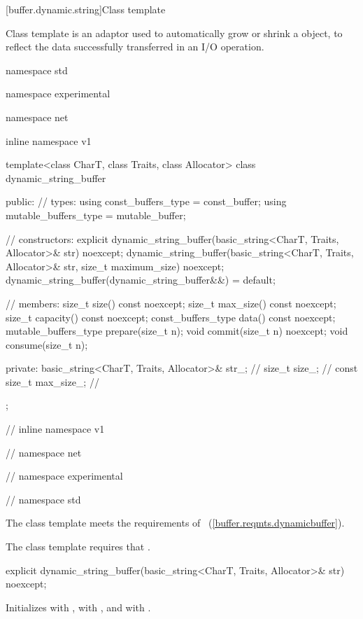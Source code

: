 [buffer.dynamic.string]{Class template }

%
\pnum
Class template  is an adaptor used to automatically grow or shrink a  object, to reflect the data successfully transferred in an I/O operation.

\begin{codeblock}
namespace std {
namespace experimental {
namespace net {
inline namespace v1 {

  template<class CharT, class Traits, class Allocator>
  class dynamic_string_buffer
  {
  public:
    // types:
    using const_buffers_type = const_buffer;
    using mutable_buffers_type = mutable_buffer;

    // constructors:
    explicit dynamic_string_buffer(basic_string<CharT, Traits, Allocator>& str) noexcept;
    dynamic_string_buffer(basic_string<CharT, Traits, Allocator>& str,
                          size_t maximum_size) noexcept;
    dynamic_string_buffer(dynamic_string_buffer&&) = default;

    // members:
    size_t size() const noexcept;
    size_t max_size() const noexcept;
    size_t capacity() const noexcept;
    const_buffers_type data() const noexcept;
    mutable_buffers_type prepare(size_t n);
    void commit(size_t n) noexcept;
    void consume(size_t n);

  private:
    basic_string<CharT, Traits, Allocator>& str_; // \expos
    size_t size_; // \expos
    const size_t max_size_; // \expos
  };

} // inline namespace v1
} // namespace net
} // namespace experimental
} // namespace std
\end{codeblock}

\pnum
The  class template meets the requirements of ~(\ref{buffer.reqmts.dynamicbuffer}).

\pnum
The  class template requires that .

%
\begin{itemdecl}
explicit dynamic_string_buffer(basic_string<CharT, Traits, Allocator>& str) noexcept;
\end{itemdecl}

\begin{itemdescr}
\pnum
\effects Initializes  with ,  with , and  with .
\end{itemdescr}

